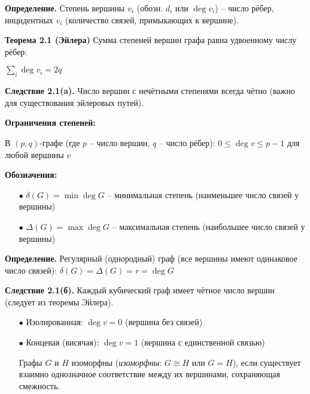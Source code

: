 \noindent\textbf{Определение.} Степень вершины $v_i$ (обозн. $d_i$ или $\deg v_i$) -- число рёбер, инцидентных $v_i$ (количество связей, примыкающих к вершине).

\noindent\textbf{Теорема 2.1 (Эйлера)} Сумма степеней вершин графа равна удвоенному числу рёбер:

$\sum_i \deg v_i = 2q$

\noindent\textbf{Следствие 2.1(a).} Число вершин с нечётными степенями всегда чётно (важно для существования эйлеровых путей).

\noindent\textbf{Ограничения степеней:}

В $(p,q)$-графе (где $p$ -- число вершин, $q$ -- число рёбер): $0 \leq \deg v \leq p-1$ для любой вершины $v$

\noindent\textbf{Обозначения:}

\begin{itemize}

\item[$\bullet$] $\delta(G) = \min \deg G$ -- минимальная степень (наименьшее число связей у вершины)

\item[$\bullet$] $\Delta(G) = \max \deg G$ -- максимальная степень (наибольшее число связей у вершины)

\end{itemize}

\noindent\textbf{Определение.} Регулярный (однородный) граф (все вершины имеют одинаковое число связей): $\delta(G) = \Delta(G) = r = \deg G$

\noindent\textbf{Следствие 2.1(б).} Каждый кубический граф имеет чётное число вершин (следует из теоремы Эйлера).

\begin{itemize}

\item[$\bullet$] Изолированная: $\deg v = 0$ (вершина без связей)

\item[$\bullet$] Концевая (висячая): $\deg v = 1$ (вершина с единственной связью)

Графы $G$ и $H$ изоморфны (\textit{изоморфны}: $G \cong H$ или $G = H$), если существует взаимно однозначное соответствие между их вершинами, сохраняющая смежность.
\end{itemize}
